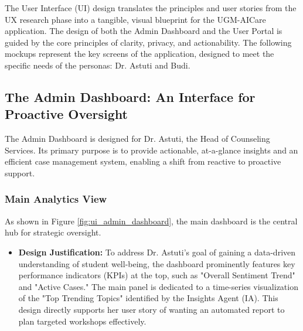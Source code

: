 The User Interface (UI) design translates the principles and user stories from the UX research phase into a tangible, visual blueprint for the UGM-AICare application. The design of both the Admin Dashboard and the User Portal is guided by the core principles of clarity, privacy, and actionability. The following mockups represent the key screens of the application, designed to meet the specific needs of the personas: Dr. Astuti and Budi.

\subsection{The Admin Dashboard: An Interface for Proactive Oversight}

The Admin Dashboard is designed for Dr. Astuti, the Head of Counseling Services. Its primary purpose is to provide actionable, at-a-glance insights and an efficient case management system, enabling a shift from reactive to proactive support.

\subsubsection{Main Analytics View}
As shown in Figure \ref{fig:ui_admin_dashboard}, the main dashboard is the central hub for strategic oversight.
\begin{itemize}
    \item \textbf{Design Justification:} To address Dr. Astuti's goal of gaining a data-driven understanding of student well-being, the dashboard prominently features key performance indicators (KPIs) at the top, such as "Overall Sentiment Trend" and "Active Cases." The main panel is dedicated to a time-series visualization of the "Top Trending Topics" identified by the Insights Agent (IA). This design directly supports her user story of wanting an automated report to plan targeted workshops effectively.
\end{itemize}

